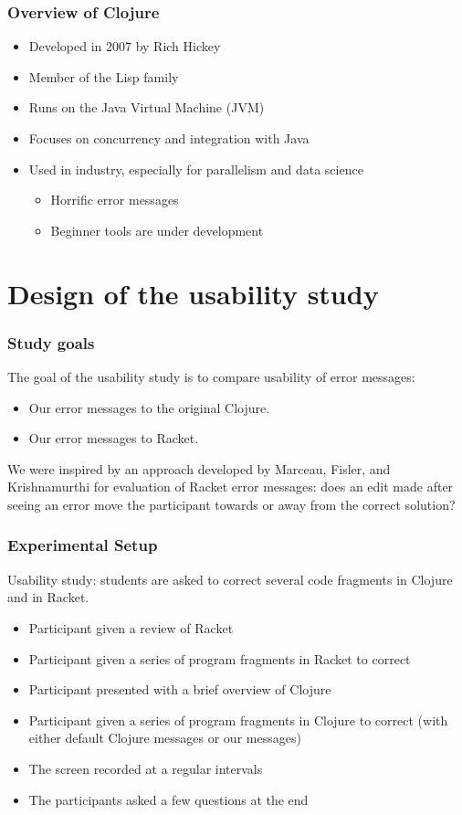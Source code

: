\documentclass{beamer}
\begin{document}
\begin{frame}
\frametitle{Overview of Clojure}
	\begin{itemize}
	\item Developed in 2007 by Rich Hickey
	\item Member of the Lisp family
  	\item Runs on the Java Virtual Machine (JVM)
  	\item Focuses on concurrency and integration with Java
	\item Used in industry, especially for parallelism and data science
		\begin{itemize}
			\item Horrific error messages
			\item Beginner tools are under development
	 	\end{itemize}
	 \end{itemize}
\end{frame}


\section{Design of the usability study} 


\begin{frame}
\frametitle{Study goals}
The goal of the usability study is to compare usability of error messages:
\begin{itemize}
\item Our error messages to the original Clojure.
\item Our error messages to Racket.
\end{itemize}

We were inspired by an approach developed by Marceau, Fisler, and Krishnamurthi for evaluation of Racket error messages: does an edit made after seeing an error move the participant towards or away from the correct solution?

\end{frame}

\begin{frame}
\frametitle{Experimental Setup}
	Usability study: students are asked to correct several code fragments in Clojure and in Racket. 
	\begin{itemize}
		\item Participant given a review of Racket
		\item Participant given a series of program fragments in Racket to correct
		\item Participant presented with a brief overview of Clojure
		\item Participant given a series of  program fragments in Clojure to correct (with either default Clojure messages or our messages) 
		\item The screen recorded at a regular intervals
		\item The participants asked a few questions at the end
	\end{itemize}
\end{frame}
\end{document}
